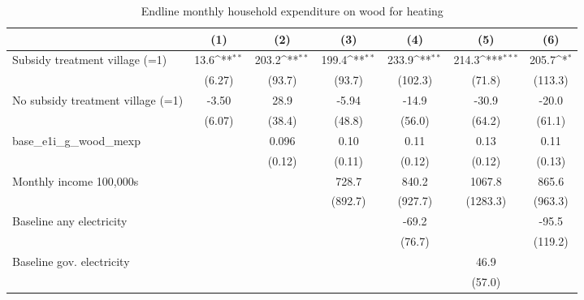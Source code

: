 \begin{table}[htbp]\centering
\def\sym#1{\ifmmode^{#1}\else\(^{#1}\)\fi}
\caption{Endline monthly household expenditure on wood for heating}
\begin{tabular*}{1\hsize}{@{\hskip\tabcolsep\extracolsep\fill}l*{6}{c}}
\toprule
                &\multicolumn{1}{c}{(1)}         &\multicolumn{1}{c}{(2)}         &\multicolumn{1}{c}{(3)}         &\multicolumn{1}{c}{(4)}         &\multicolumn{1}{c}{(5)}         &\multicolumn{1}{c}{(6)}         \\
\midrule
Subsidy treatment village (=1)&     13.6\sym{**} &    203.2\sym{**} &    199.4\sym{**} &    233.9\sym{**} &    214.3\sym{***}&    205.7\sym{*}  \\
                &   (6.27)         &   (93.7)         &   (93.7)         &  (102.3)         &   (71.8)         &  (113.3)         \\
No subsidy treatment village (=1)&    -3.50         &     28.9         &    -5.94         &    -14.9         &    -30.9         &    -20.0         \\
                &   (6.07)         &   (38.4)         &   (48.8)         &   (56.0)         &   (64.2)         &   (61.1)         \\
base\_e1i\_g\_wood\_mexp&                  &    0.096         &     0.10         &     0.11         &     0.13         &     0.11         \\
                &                  &   (0.12)         &   (0.11)         &   (0.12)         &   (0.12)         &   (0.13)         \\
Monthly income 100,000s&                  &                  &    728.7         &    840.2         &   1067.8         &    865.6         \\
                &                  &                  &  (892.7)         &  (927.7)         & (1283.3)         &  (963.3)         \\
Baseline any electricity&                  &                  &                  &    -69.2         &                  &    -95.5         \\
                &                  &                  &                  &   (76.7)         &                  &  (119.2)         \\
Baseline gov. electricity&                  &                  &                  &                  &     46.9         &                  \\
                &                  &                  &                  &                  &   (57.0)         &                  \\

\end{tabular*}
\end{table}
